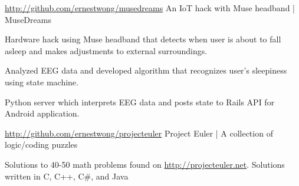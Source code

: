 \begin{cventries}
  \cventry
    {\href{http://github.com/ernestwong/musedreams}{http://github.com/ernestwong/musedreams}} %
    { An IoT hack with Muse headband | MuseDreams } %
    {} %
    {} %
    {
      \begin{cvitems} %
      \item {Hardware hack using Muse headband that detects when user is about to fall asleep and makes adjustments to external surroundings. }
      \item {Analyzed EEG data and developed algorithm that recognizes user's sleepiness using state machine. }
      \item {Python server which interprets EEG data and posts state to Rails API for Android application. }
      \end{cvitems}
    }

  \cventry
    {\href{http://github.com/ernestwong/projecteuler}{http://github.com/ernestwong/projecteuler}} %
    {Project Euler | A collection of logic/coding puzzles } %
    {} %
    {} %
    {
      \begin{cvitems} %
        \item {Solutions to 40-50 math problems found on \href{http://projecteuler.net}{http://projecteuler.net}. Solutions written in C, C++, C\#, and Java}
      \end{cvitems}
    }

\end{cventries}

